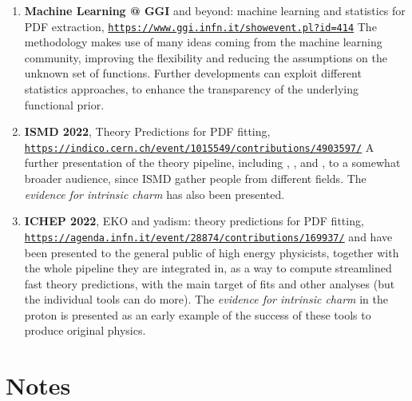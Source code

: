 \documentclass[10pt, a4paper, sans]{moderncv}
\newcommand{\tturl}[1]{\texttt{\url{#1}}}
\begin{document}
\begin{multicols}{2}
\begin{enumerate}
    \item \textbf{Machine Learning @ GGI}
      \nnpdf{} and beyond: machine learning and statistics for PDF extraction,
      \tturl{https://www.ggi.infn.it/showevent.pl?id=414}
      The  methodology makes use of many ideas coming from the
      machine learning community, improving the flexibility and reducing the
      assumptions on the unknown set of functions.
      Further developments can exploit different statistics approaches, to
      enhance the transparency of the underlying functional prior.
    \item \textbf{ISMD 2022},
      Theory Predictions for PDF fitting,
      \tturl{https://indico.cern.ch/event/1015549/contributions/4903597/}
      \newline
      A further presentation of the theory pipeline, including \eko, \yadism,
      and \pineappl, to a somewhat broader audience, since ISMD gather people
      from different fields. The \textit{evidence for intrinsic charm} has also
      been presented.
    \item \textbf{ICHEP 2022}, 
      EKO and yadism: theory predictions for PDF fitting,
      \tturl{https://agenda.infn.it/event/28874/contributions/169937/}
      \newline
      \eko and \yadism have been presented to the general public of high energy
      physicists, together with the whole pipeline they are integrated in, as a
      way to compute streamlined fast theory predictions, with the main target
      of \pdf fits and other analyses (but the individual tools can do more).
      The \textit{evidence for intrinsic charm} in the proton is presented as
      an early example of the success of these tools to produce original
      physics.
\end{enumerate}

\vspace{30pt}
\section{Notes}


\end{multicols}
\end{document}
